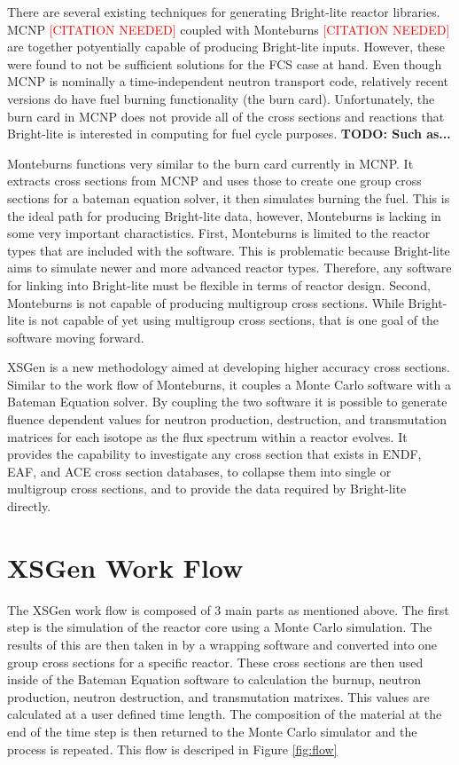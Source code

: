 \documentclass{article}
\newcommand{\citeme}{\textcolor{red}{[CITATION NEEDED]}\xspace}
\newcommand{\TODO}[1] {{\color{red}\textbf{TODO: #1}}}
\begin{document}
There are several existing techniques for generating Bright-lite reactor libraries.
MCNP \citeme coupled with Monteburns \citeme are together potyentially capable of
producing Bright-lite inputs. However, these were found to not be sufficient solutions
for the FCS case at hand. Even though MCNP is nominally a time-independent neutron transport
code, relatively recent versions do have fuel burning functionality (the burn card).
Unfortunately, the burn card in MCNP does not provide all of the cross sections and
reactions that Bright-lite is interested in computing for fuel cycle purposes.
\TODO{Such as...}

Monteburns functions very similar to the burn card currently in MCNP. It extracts cross sections from MCNP and uses those to create one group cross sections for a bateman equation solver, it then simulates burning the fuel. This is the ideal path for producing Bright-lite data, however, Monteburns is lacking in some very important charactistics. First, Monteburns is limited to the reactor types that are included with the software. This is problematic because Bright-lite aims to simulate newer and more advanced reactor types. Therefore, any software for linking into Bright-lite must be flexible in terms of reactor design. Second, Monteburns is not capable of producing multigroup cross sections. While Bright-lite is not capable of yet using multigroup cross sections, that is one goal of the software moving forward.

XSGen is a new methodology aimed at developing higher accuracy cross sections. Similar to the work flow of Monteburns, it couples a Monte Carlo software with a Bateman Equation solver.  By coupling the two software it is possible to generate fluence dependent values for neutron production, destruction, and transmutation matrices for each isotope as the flux spectrum within a reactor evolves. It provides the capability to investigate any cross section that exists in ENDF, EAF, and ACE cross section databases, to collapse them into single or multigroup cross sections, and to provide the data required by Bright-lite directly.

\section{XSGen Work Flow}
The XSGen work flow is composed of 3 main parts as mentioned above. The first step is the simulation of the reactor core using a Monte Carlo simulation. The results of this are then taken in by a wrapping software and converted into one group cross sections for a specific reactor. These cross sections are then used inside of the Bateman Equation software to calculation the burnup, neutron production, neutron destruction, and transmutation matrixes. This values are calculated at a user defined time length. The composition of the material at the end of the time step is then returned to the Monte Carlo simulator and the process is repeated. This flow is descriped in Figure \ref{fig:flow}
\end{document}
